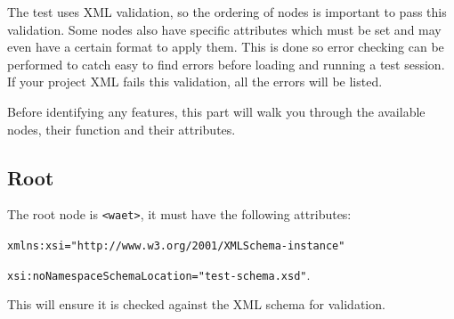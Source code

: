 \documentclass[11pt, oneside]{article}   	%
\begin{document}
    The test uses XML validation, so the ordering of nodes is important to pass this validation. Some nodes also have specific attributes which must be set and may even have a certain format to apply them. This is done so error checking can be performed to catch easy to find errors before loading and running a test session. If your project XML fails this validation, all the errors will be listed.
    
    Before identifying any features, this part will walk you through the available nodes, their function and their attributes.
    
    \subsection{Root}
        The root node is \texttt{<waet>}, it must have the following attributes:
        
        \texttt{xmlns:xsi="http://www.w3.org/2001/XMLSchema-instance"}
        
        \texttt{xsi:noNamespaceSchemaLocation="test-schema.xsd"}.
        
        This will ensure it is checked against the XML schema for validation.
\end{document}
